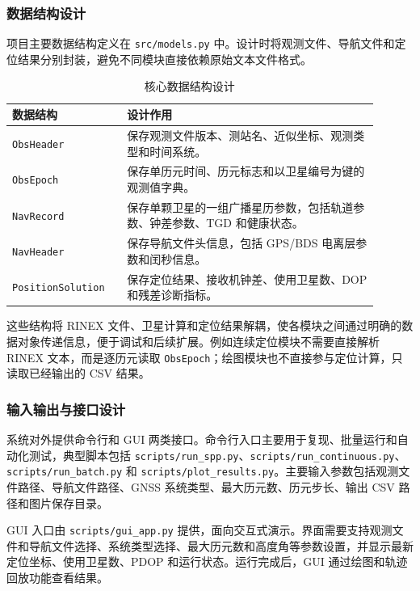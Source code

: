 \subsubsection{数据结构设计}

项目主要数据结构定义在 \texttt{src/models.py} 中。设计时将观测文件、导航文件和定位结果分别封装，避免不同模块直接依赖原始文本文件格式。

\begin{table}[H]
\centering
\small
\begin{tabular}{p{0.28\linewidth}p{0.62\linewidth}}
\toprule
数据结构 & 设计作用 \\
\midrule
\texttt{ObsHeader} & 保存观测文件版本、测站名、近似坐标、观测类型和时间系统。 \\
\texttt{ObsEpoch} & 保存单历元时间、历元标志和以卫星编号为键的观测值字典。 \\
\texttt{NavRecord} & 保存单颗卫星的一组广播星历参数，包括轨道参数、钟差参数、TGD 和健康状态。 \\
\texttt{NavHeader} & 保存导航文件头信息，包括 GPS/BDS 电离层参数和闰秒信息。 \\
\texttt{PositionSolution} & 保存定位结果、接收机钟差、使用卫星数、DOP 和残差诊断指标。 \\
\bottomrule
\end{tabular}
\caption{核心数据结构设计}
\label{tab:data-structures}
\end{table}

这些结构将 RINEX 文件、卫星计算和定位结果解耦，使各模块之间通过明确的数据对象传递信息，便于调试和后续扩展。例如连续定位模块不需要直接解析 RINEX 文本，而是逐历元读取 \texttt{ObsEpoch}；绘图模块也不直接参与定位计算，只读取已经输出的 CSV 结果。

\subsubsection{输入输出与接口设计}

系统对外提供命令行和 GUI 两类接口。命令行入口主要用于复现、批量运行和自动化测试，典型脚本包括 \texttt{scripts/run\_spp.py}、\texttt{scripts/run\_continuous.py}、\texttt{scripts/run\_batch.py} 和 \texttt{scripts/plot\_results.py}。主要输入参数包括观测文件路径、导航文件路径、GNSS 系统类型、最大历元数、历元步长、输出 CSV 路径和图片保存目录。

GUI 入口由 \texttt{scripts/gui\_app.py} 提供，面向交互式演示。界面需要支持观测文件和导航文件选择、系统类型选择、最大历元数和高度角等参数设置，并显示最新定位坐标、使用卫星数、PDOP 和运行状态。运行完成后，GUI 通过绘图和轨迹回放功能查看结果。


